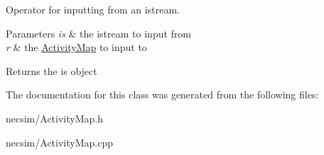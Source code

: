 Operator for inputting from an istream. 


\begin{DoxyParams}{Parameters}
{\em is} & the istream to input from \\
\hline
{\em r} & the \hyperlink{class_activity_map}{Activity\+Map} to input to \\
\hline
\end{DoxyParams}
\begin{DoxyReturn}{Returns}
the is object 
\end{DoxyReturn}


The documentation for this class was generated from the following files\+:\begin{DoxyCompactItemize}
\item 
necsim/Activity\+Map.\+h\item 
necsim/Activity\+Map.\+cpp\end{DoxyCompactItemize}
